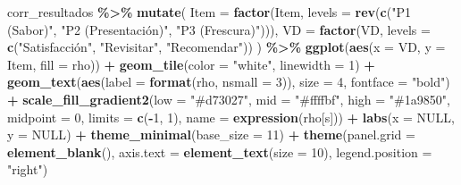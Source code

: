 \documentclass[
  spanish,
]{article}
\newenvironment{Shaded}{\begin{snugshade}}{\end{snugshade}}
\newcommand{\AttributeTok}[1]{\textcolor[rgb]{0.13,0.29,0.53}{#1}}
\newcommand{\ConstantTok}[1]{\textcolor[rgb]{0.56,0.35,0.01}{#1}}
\newcommand{\DecValTok}[1]{\textcolor[rgb]{0.00,0.00,0.81}{#1}}
\newcommand{\FunctionTok}[1]{\textcolor[rgb]{0.13,0.29,0.53}{\textbf{#1}}}
\newcommand{\NormalTok}[1]{#1}
\newcommand{\SpecialCharTok}[1]{\textcolor[rgb]{0.81,0.36,0.00}{\textbf{#1}}}
\newcommand{\StringTok}[1]{\textcolor[rgb]{0.31,0.60,0.02}{#1}}
\begin{document}
\begin{Shaded}
\begin{Highlighting}[]
\NormalTok{corr\_resultados }\SpecialCharTok{\%\textgreater{}\%}
  \FunctionTok{mutate}\NormalTok{(}
    \AttributeTok{Item =} \FunctionTok{factor}\NormalTok{(Item, }\AttributeTok{levels =} \FunctionTok{rev}\NormalTok{(}\FunctionTok{c}\NormalTok{(}\StringTok{"P1 (Sabor)"}\NormalTok{, }\StringTok{"P2 (Presentación)"}\NormalTok{, }
                                        \StringTok{"P3 (Frescura)"}\NormalTok{))),}
    \AttributeTok{VD   =} \FunctionTok{factor}\NormalTok{(VD, }\AttributeTok{levels =} \FunctionTok{c}\NormalTok{(}\StringTok{"Satisfacción"}\NormalTok{, }\StringTok{"Revisitar"}\NormalTok{, }\StringTok{"Recomendar"}\NormalTok{))}
\NormalTok{  ) }\SpecialCharTok{\%\textgreater{}\%}
  \FunctionTok{ggplot}\NormalTok{(}\FunctionTok{aes}\NormalTok{(}\AttributeTok{x =}\NormalTok{ VD, }\AttributeTok{y =}\NormalTok{ Item, }\AttributeTok{fill =}\NormalTok{ rho)) }\SpecialCharTok{+}
  \FunctionTok{geom\_tile}\NormalTok{(}\AttributeTok{color =} \StringTok{"white"}\NormalTok{, }\AttributeTok{linewidth =} \DecValTok{1}\NormalTok{) }\SpecialCharTok{+}
  \FunctionTok{geom\_text}\NormalTok{(}\FunctionTok{aes}\NormalTok{(}\AttributeTok{label =} \FunctionTok{format}\NormalTok{(rho, }\AttributeTok{nsmall =} \DecValTok{3}\NormalTok{)), }\AttributeTok{size =} \DecValTok{4}\NormalTok{, }\AttributeTok{fontface =} \StringTok{"bold"}\NormalTok{) }\SpecialCharTok{+}
  \FunctionTok{scale\_fill\_gradient2}\NormalTok{(}\AttributeTok{low =} \StringTok{"\#d73027"}\NormalTok{, }\AttributeTok{mid =} \StringTok{"\#ffffbf"}\NormalTok{, }\AttributeTok{high =} \StringTok{"\#1a9850"}\NormalTok{,}
                        \AttributeTok{midpoint =} \DecValTok{0}\NormalTok{, }\AttributeTok{limits =} \FunctionTok{c}\NormalTok{(}\SpecialCharTok{{-}}\DecValTok{1}\NormalTok{, }\DecValTok{1}\NormalTok{),}
                        \AttributeTok{name =} \FunctionTok{expression}\NormalTok{(rho[s])) }\SpecialCharTok{+}
  \FunctionTok{labs}\NormalTok{(}\AttributeTok{x =} \ConstantTok{NULL}\NormalTok{, }\AttributeTok{y =} \ConstantTok{NULL}\NormalTok{) }\SpecialCharTok{+}
  \FunctionTok{theme\_minimal}\NormalTok{(}\AttributeTok{base\_size =} \DecValTok{11}\NormalTok{) }\SpecialCharTok{+}
  \FunctionTok{theme}\NormalTok{(}\AttributeTok{panel.grid =} \FunctionTok{element\_blank}\NormalTok{(),}
        \AttributeTok{axis.text  =} \FunctionTok{element\_text}\NormalTok{(}\AttributeTok{size =} \DecValTok{10}\NormalTok{),}
        \AttributeTok{legend.position =} \StringTok{"right"}\NormalTok{)}
\end{Highlighting}
\end{Shaded}
\end{document}
